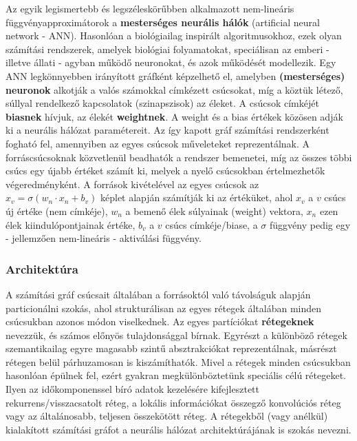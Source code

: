 Az egyik legismertebb és legszéleskörűbben alkalmazott nem-lineáris függvényapproximátorok a \textbf{mesterséges neurális hálók} (artificial neural network - ANN). Hasonlóan a biológiailag inspirált algoritmusokhoz, ezek olyan számítási rendszerek, amelyek biológiai folyamatokat, speciálisan az emberi - illetve állati - agyban működő neuronokat, és azok működését modellezik. Egy ANN legkönnyebben irányított gráfként képzelhető el, amelyben \textbf{(mesterséges) neuronok} alkotják a valós számokkal címkézett csúcsokat, míg a köztük létező, súllyal rendelkező kapcsolatok (szinapszisok) az éleket. A csúcsok címkéjét \textbf{biasnek} hívjuk, az élekét \textbf{weightnek}. A weight és a bias értékek közösen adják ki a neurális hálózat paramétereit. Az így kapott gráf számítási rendszerként fogható fel, amennyiben az egyes csúcsok műveleteket reprezentálnak. A forráscsúcsoknak közvetlenül beadhatók a rendszer bemenetei, míg az összes többi csúcs egy újabb értéket számít ki, melyek a nyelő csúcsokban értelmezhetők végeredményként. A források kivételével az egyes csúcsok az $x_v=\sigma(w_n \cdot x_n +b_v)$ képlet alapján számítják ki az értéküket, ahol $x_v$ a $v$ csúcs új értéke (nem címkéje), $w_n$ a bemenő élek súlyainak (weight) vektora, $x_n$ ezen élek kiindulópontjainak értéke, $b_v$ a $v$ csúcs címkéje/biase, a $\sigma$ függvény pedig egy - jellemzően nem-lineáris - aktiválási függvény.

\subsubsection{Architektúra}

A számítási gráf csúcsait általában a forrásoktól való távolságuk alapján particionálni szokás, ahol strukturálisan az egyes rétegek általában minden csúcsukban azonos módon viselkednek. Az egyes partíciókat \textbf{rétegeknek} nevezzük, és számos előnyös tulajdonsággal bírnak. Egyrészt a különböző rétegek szemantikailag egyre magasabb szintű absztrakciókat reprezentálnak, másrészt rétegen belül párhuzamosan is kiszámíthatók.
Mivel a rétegek minden csúcsukban hasonlóan épülnek fel, ezért gyakran megkülönböztetünk speciális célú rétegeket. Ilyen az időkomponenssel bíró adatok kezelésére kifejlesztett rekurrens/visszacsatolt réteg, a lokális információkat összegző konvolúciós réteg vagy az általánosabb, teljesen összekötött réteg. A rétegekből (vagy anélkül) kialakított számítási gráfot a neurális hálózat architektúrájának is szokás nevezni.


